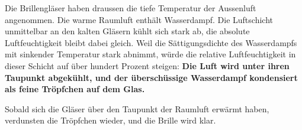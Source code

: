 Die Brillengläser haben draussen die tiefe Temperatur der Aussenluft angenommen. Die warme Raumluft enthält Wasserdampf. Die Luftschicht unmittelbar an den kalten Gläsern kühlt sich stark ab, die absolute Luftfeuchtigkeit bleibt dabei gleich. Weil die Sättigungsdichte des Wasserdampfs mit sinkender Temperatur stark abnimmt, würde die relative Luftfeuchtigkeit in dieser Schicht auf über hundert Prozent steigen: \textbf{Die Luft wird unter ihren Taupunkt abgekühlt, und der überschüssige Wasserdampf kondensiert als feine Tröpfchen auf dem Glas.}

Sobald sich die Gläser über den Taupunkt der Raumluft erwärmt haben, verdunsten die Tröpfchen wieder, und die Brille wird klar.
